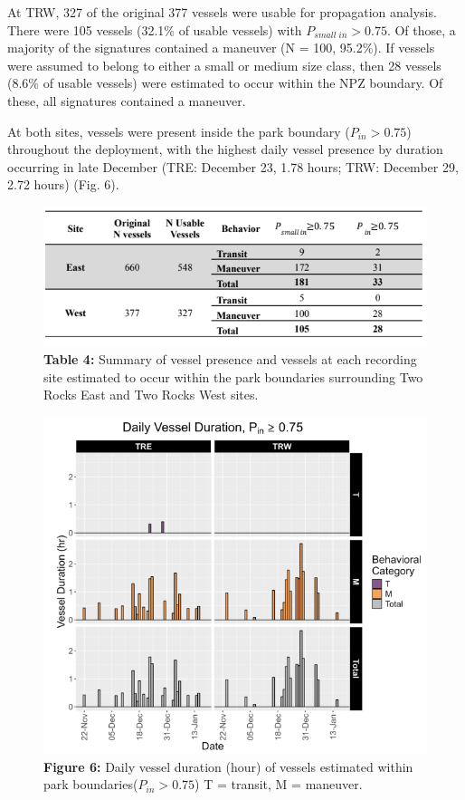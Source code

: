 \documentclass[
  letterpaper,
  oneside,
  open=any]{scrbook}
\begin{document}
At TRW, 327 of the original 377 vessels were usable for propagation
analysis. There were 105 vessels (32.1\% of usable vessels) with
\(P_{small\;in} > 0.75\). Of those, a majority of the signatures
contained a maneuver (N = 100, 95.2\%). If vessels were assumed to
belong to either a small or medium size class, then 28 vessels (8.6\% of
usable vessels) were estimated to occur within the NPZ boundary. Of
these, all signatures contained a maneuver.

At both sites, vessels were present inside the park boundary
(\(P_{in} > 0.75\)) throughout the deployment, with the highest daily
vessel presence by duration occurring in late December (TRE: December
23, 1.78 hours; TRW: December 29, 2.72 hours) (Fig. 6).

\begin{figure}[H]

{\centering \includegraphics{images/Table.4.PNG}

}

\caption{\textbf{Table 4:} Summary of vessel presence and vessels at
each recording site estimated to occur within the park boundaries
surrounding Two Rocks East and Two Rocks West sites.}

\end{figure}%
\begin{figure}[H]

{\centering \includegraphics{images/Figure.6.PNG}

}

\caption{\textbf{Figure 6:} Daily vessel duration (hour) of vessels
estimated within park boundaries(\(P_{in} > 0.75\)) T = transit, M =
maneuver.}

\end{figure}%
\end{document}

